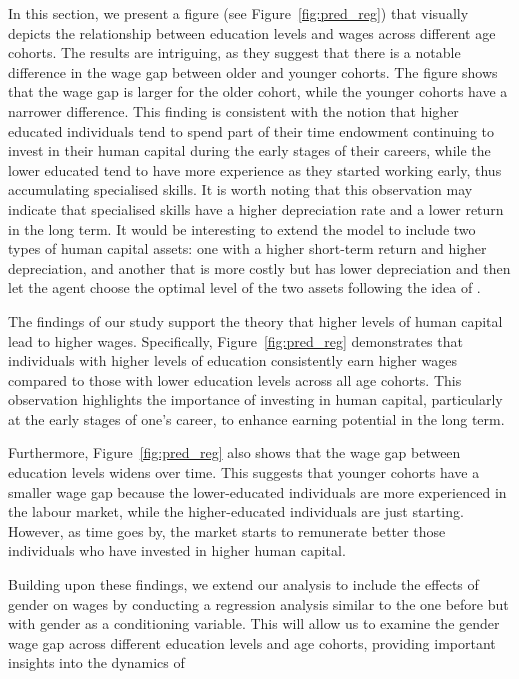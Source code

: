 \documentclass[12pt]{article}
\begin{document}
\par
In this section, we present a figure (see Figure~\ref{fig:pred_reg}) that visually depicts the relationship between
education levels and wages across different age cohorts. The results are intriguing, as they suggest that there is a
notable difference in the wage gap between older and younger cohorts. The figure shows that the wage gap is larger for
the older cohort, while the younger cohorts have a narrower difference. This finding is consistent with the notion that
higher educated individuals tend to spend part of their time endowment continuing to invest in their human capital
during the early stages of their careers, while the lower educated tend to have more experience as they started working
early, thus accumulating specialised skills. It is worth noting that this observation may indicate that specialised
skills have a higher depreciation rate and a lower return in the long term. It would be interesting to extend the model
to include two types of human capital assets: one with a higher short-term return and higher depreciation, and another
that is more costly but has lower depreciation and then let the agent choose the optimal level of the two assets
following the idea of \citet{Kruger}.
\par
The findings of our study support the theory that higher levels of human capital lead to higher wages. Specifically,
Figure~\ref{fig:pred_reg} demonstrates that individuals with higher levels of education consistently earn higher wages
compared to those with lower education levels across all age cohorts. This observation highlights the importance of
investing in human capital, particularly at the early stages of one's career, to enhance earning potential in the long
term.
\par
Furthermore, Figure~\ref{fig:pred_reg} also shows that the wage gap between education levels widens over time. This
suggests that younger cohorts have a smaller wage gap because the lower-educated individuals are more experienced in the
labour market, while the higher-educated individuals are just starting. However, as time goes by, the market starts
to remunerate better those individuals who have invested in higher human capital.
\par
Building upon these findings, we extend our analysis to include the effects of gender on wages by conducting a
regression analysis similar to the one before but with gender as a conditioning variable. This will allow us to examine
the gender wage gap across different education levels and age cohorts, providing important insights into the dynamics of
\end{document}
